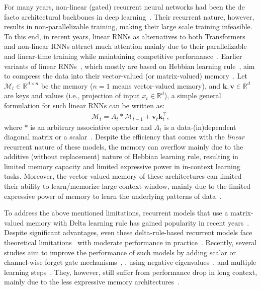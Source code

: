 \documentclass{article}
\newcommand{\citep}{\parencite}
\newcommand{\vk}[0]{\mathbf{k}}
\newcommand{\vvv}[0]{\mathbf{v}}
\newcommand{\M}[0]{\mathcal{M}}
\theoremstyle{plain}
\theoremstyle{definition}
\theoremstyle{remark}
\newcommand{\head}[1]{\vspace{1.7mm}\noindent{{\textcolor{c2}{\bf #1.}}}}
\begin{document}
\head{(Linear) Recurrent Models}
For many years, non-linear (gated) recurrent neural networks had been the de facto architectural backbones in deep learning~\citep{greff2016lstm}. Their recurrent nature, however, results in non-parallelizable training, making their large scale training infeasible. To this end, in recent years, linear RNNs as alternatives to both Transformers and non-linear RNNs attract much attention mainly due to their parallelizable and linear-time training while maintaining competitive performance~\citep{yang2024parallelizing, sun2023retentive, rwkv-repo}. Earlier variants of linear RNNs~\citep{yang2024gatedattn, sun2023retentive, de2024griffin}, which mostly are based on Hebbian learning rule~\citep{hebb2005organization}, aim to compress the data into their vector-valued (or matrix-valued) memory~\citep{katharopoulos2020transformers, sun2023retentive, yang2024gatedattn, de2024griffin, liu2024longhorn}. Let $\M_t \in \mathbb{R}^{d \times n}$ be the memory ($n=1$ means vector-valued memory), and $\vk, \vvv \in \mathbb{R}^{d}$ are keys and values (i.e., projection of input $x_t \in \mathbb{R}^{d}$), a simple general formulation for such linear RNNs can be written as:
\begin{align}
    \M_t = A_{t} \ast \M_{t-1} + \vvv_t \vk_t^{\top}, 
\end{align}
where $\ast$ is an arbitrary associative operator and $A_t$ is a data-(in)dependent diagonal matrix or a scalar~\citep{yang2024parallelizing}. Despite the efficiency that comes with the \emph{linear} recurrent nature of these models, the memory can overflow mainly due to the additive (without replacement) nature of Hebbian learning rule, resulting in limited memory capacity and limited expressive power in in-context learning tasks. Moreover, the vector-valued memory of these architectures can limited their ability to learn/memorize large context window, mainly due to the limited expressive power of memory to learn the underlying patterns of data~\citep{behrouz2024titans, sun2024learning}.

To address the above mentioned limitations, recurrent models that use a matrix-valued memory with Delta learning rule has gained popularity in recent years~\citep{neil2017delta,schlag2021linear, yang2024parallelizing}. Despite significant advantages, even these delta-rule-based recurrent models face theoretical limitations~\citep{irie2023practical} with moderate performance in practice~\citep{yang2024parallelizing}. Recently, several studies aim to improve the performance of such models by adding scalar or channel-wise forget gate mechanisms~\citep{yang2024gated, peng2025rwkv7}, , using negative eigenvalues~\citep{grazzi2024unlocking}, and multiple learning steps~\citep{siems2025deltaproduct}. They, however, still suffer from performance drop in long context, mainly due to the less expressive memory architectures~\citep{behrouz2024titans}. 
\end{document}
